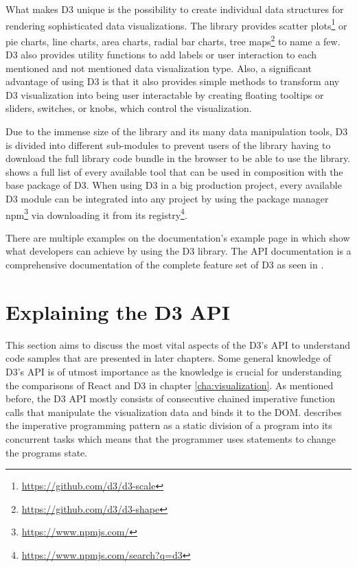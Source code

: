 What makes D3 unique is the possibility to create individual data structures for rendering sophisticated data visualizations. The library provides scatter plots\footnote{\url{https://github.com/d3/d3-scale}} or pie charts, line charts, area charts, radial bar charts, tree maps\footnote{\url{https://github.com/d3/d3-shape}} to name a few. D3 also provides utility functions to add labels or user interaction to each mentioned and not mentioned data visualization type. Also, a significant advantage of using D3 is that it also provides simple methods to transform any D3 visualization into being user interactable by creating floating tooltips or sliders, switches, or knobs, which control the visualization.

Due to the immense size of the library and its many data manipulation tools, D3 is divided into different sub-modules to prevent users of the library having to download the full library code bundle in the browser to be able to use the library. \cite{D3Github} shows a full list of every available tool that can be used in composition with the base package of D3. When using D3 in a big production project, every available D3 module can be integrated into any project by using the package manager \textsf{npm}\footnote{\url{https://www.npmjs.com/}} via downloading it from its registry\footnote{\url{https://www.npmjs.com/search?q=d3}}.

\begin{emergency}{1em}
There are multiple examples on the documentation's example page in \cite{D3Examples} which show what developers can achieve by using the D3 library. The API documentation is a comprehensive documentation of the complete feature set of D3 as seen in \cite{D3Github}. %
\end{emergency}


\section{Explaining the D3 API} 

This section aims to discuss the most vital aspects of the D3's API to understand code samples that are presented in later chapters. Some general knowledge of D3's API is of utmost importance as the knowledge is crucial for understanding the comparisons of React and D3 in chapter \ref{cha:visualization}. As mentioned before, the D3 API mostly consists of consecutive chained imperative function calls that manipulate the visualization data and binds it to the DOM. \cite[p.\ 625]{prgLngDesignImpl} describes the imperative programming pattern as a static division of a program into its concurrent tasks which means that the programmer uses statements to change the programs state. 

